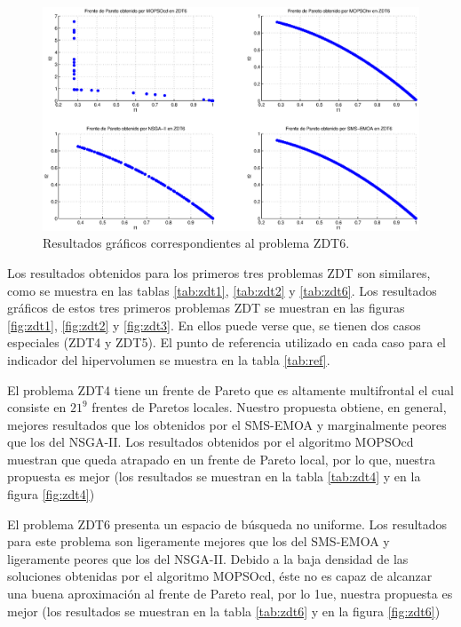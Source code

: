   \begin{figure}
      \begin{center}
	  \includegraphics[scale=0.45]{Cap4/rzdt6r.eps}
      \end{center}
	\caption{Resultados gr\'aficos correspondientes al problema ZDT6.}
      \label{fig:rZDT6}
      \end{figure}
\clearpage
   
  Los resultados obtenidos para los primeros tres problemas ZDT son similares, como se muestra en las tablas \ref{tab:zdt1}, 
  \ref{tab:zdt2} y \ref{tab:zdt6}. Los resultados gr\'aficos de estos tres primeros problemas ZDT se muestran en las 
  figuras \ref{fig:zdt1}, \ref{fig:zdt2} y \ref{fig:zdt3}. En ellos puede verse que, se tienen dos casos especiales (ZDT4 y ZDT5). El punto 
  de referencia utilizado en cada caso para el indicador del hipervolumen se muestra en la tabla \ref{tab:ref}.
  
  El problema ZDT4 tiene un frente de Pareto que es altamente multifrontal el cual consiste en $21^9$ frentes de Paretos locales.
  Nuestro propuesta obtiene, en general, mejores resultados que los obtenidos por el SMS-EMOA y marginalmente peores que los del NSGA-II.
  Los resultados obtenidos por el algoritmo MOPSOcd muestran que queda atrapado en un frente de Pareto local, por lo que,
  nuestra propuesta es mejor (los resultados se muestran en la tabla \ref{tab:zdt4} y en la figura \ref{fig:zdt4})
  
  El problema ZDT6 presenta un espacio de b\'usqueda no uniforme. Los resultados para este problema son ligeramente 
  mejores que los del SMS-EMOA y ligeramente peores que los del NSGA-II. Debido a la baja densidad de las soluciones obtenidas por 
  el algoritmo MOPSOcd, \'este no es capaz de alcanzar una buena aproximaci\'on al frente de Pareto real, por lo 1ue, nuestra propuesta es mejor
  (los resultados se muestran en la tabla \ref{tab:zdt6} y en la figura \ref{fig:zdt6})
  
